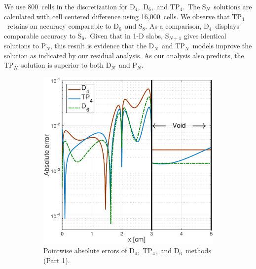 \documentclass[review]{elsarticle}
\newcommand{\pn}{P$_N$}
\newcommand{\dn}{D$_N$}
\newcommand{\tp}[1]{TP$_{#1}$}
\begin{document}
We use $800$\ cells in the discretization for D$_4$,\ D$_6$,\ and \tp{4}.\ 
The  S$_N$\ solutions are calculated with cell centered difference  using 16,000\ cells. We observe that TP$_4$\ retains an accuracy comparable to D$_6$\ and S$_8$. As a comparison, D$_4$\ displays comparable accuracy to S$_6$.\ Given that in 1-D slabs, S$_{N+1}$ gives identical solutions to P$_N$, this result is evidence that the \dn~and T\pn~models improve the solution as indicated by our residual analysis. As our analysis also predicts, the T\pn~solution is superior to both \dn~and \pn.

\begin{figure}[ht!]
	\begin{subfigure}{.5\textwidth}
	\begin{center}
		\hspace*{-1cm}\includegraphics[width=1.\textwidth]{reed_error12.pdf}
		\caption[]{Pointwise absolute errors of D$_4$,\ TP$_4$,\ and D$_6$\ methods (Part 1).}%
		\label{reed_er1}
	\end{center}
\end{subfigure}
~
\begin{subfigure}{.5\textwidth}

\end{subfigure}
\end{figure}
\end{document}
